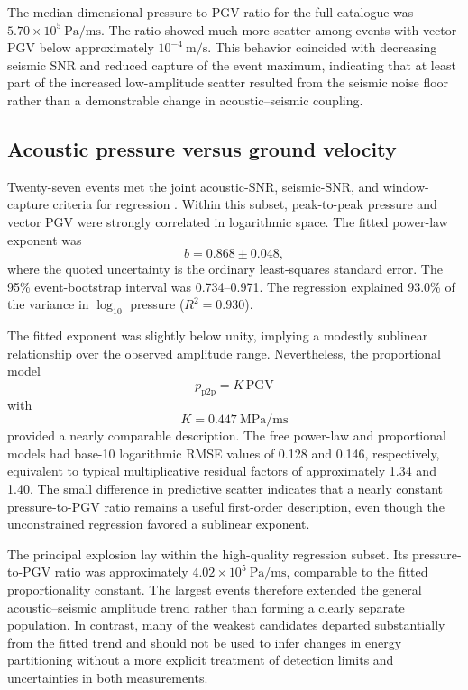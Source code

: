 \documentclass[]{seismica}
\begin{document}
The median dimensional pressure-to-PGV ratio for the full catalogue was
$5.70\times10^{5}\ \si{\pascal\per\metre\second}$. The ratio showed much more
scatter among events with vector PGV below approximately
$10^{-4}\ \si{\metre\per\second}$. This behavior coincided with decreasing
seismic SNR and reduced capture of the event maximum, indicating that at least
part of the increased low-amplitude scatter resulted from the seismic noise
floor rather than a demonstrable change in acoustic--seismic coupling.


\subsection{Acoustic pressure versus ground velocity}
\label{sec:results_regression}

Twenty-seven events met the joint acoustic-SNR, seismic-SNR, and window-capture
criteria for regression . Within this subset, peak-to-peak pressure and
vector PGV were strongly correlated in logarithmic space. The fitted power-law
exponent was
\begin{equation}
  b = 0.868 \pm 0.048,
\end{equation}
where the quoted uncertainty is the ordinary least-squares standard error. The
95\% event-bootstrap interval was 0.734--0.971. The regression explained 93.0\%
of the variance in $\log_{10}$ pressure ($R^2=0.930$).

The fitted exponent was slightly below unity, implying a modestly sublinear
relationship over the observed amplitude range. Nevertheless, the proportional
model
\begin{equation}
  p_{\mathrm{p2p}} = K\,\mathrm{PGV}
\end{equation}
with
\begin{equation}
  K = \SI{0.447}{\mega\pascal\per\metre\second}
\end{equation}
provided a nearly comparable description. The free power-law and proportional
models had base-10 logarithmic RMSE values of 0.128 and 0.146, respectively,
equivalent to typical multiplicative residual factors of approximately 1.34 and
1.40. The small difference in predictive scatter indicates that a nearly
constant pressure-to-PGV ratio remains a useful first-order description, even
though the unconstrained regression favored a sublinear exponent.

The principal explosion lay within the high-quality regression subset. Its
pressure-to-PGV ratio was approximately
$4.02\times10^{5}\ \si{\pascal\per\metre\second}$, comparable to the fitted
proportionality constant. The largest events therefore extended the general
acoustic--seismic amplitude trend rather than forming a clearly separate
population. In contrast, many of the weakest candidates departed substantially
from the fitted trend and should not be used to infer changes in energy
partitioning without a more explicit treatment of detection limits and
uncertainties in both measurements.
\end{document}
